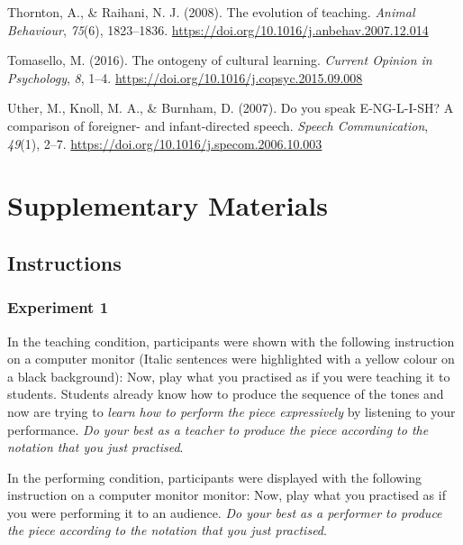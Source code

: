 \documentclass[
  english,
  man,floatsintext]{apa6}
\newlength{\cslhangindent}
\newenvironment{CSLReferences}[2] %
 {%
  \setlength{\parindent}{0pt}
  \ifodd #1 \everypar{\setlength{\hangindent}{\cslhangindent}}\ignorespaces\fi
  \ifnum #2 > 0
  \setlength{\parskip}{#2\baselineskip}
  \fi
 }%
 {}
\begin{document}
\begin{CSLReferences}{1}{0}
\leavevmode{}%
Thornton, A., \& Raihani, N. J. (2008). The evolution of teaching. \emph{Animal Behaviour}, \emph{75}(6), 1823--1836. \url{https://doi.org/10.1016/j.anbehav.2007.12.014}

\leavevmode{}%
Tomasello, M. (2016). The ontogeny of cultural learning. \emph{Current Opinion in Psychology}, \emph{8}, 1--4. \url{https://doi.org/10.1016/j.copsyc.2015.09.008}

\leavevmode{}%
Uther, M., Knoll, M. A., \& Burnham, D. (2007). Do you speak {E}-{NG}-{L}-{I}-{SH}? {A} comparison of foreigner- and infant-directed speech. \emph{Speech Communication}, \emph{49}(1), 2--7. \url{https://doi.org/10.1016/j.specom.2006.10.003}

\end{CSLReferences}

\endgroup

\clearpage

\hypertarget{supplementary}{%
\section{Supplementary Materials}\label{supplementary}}

\hypertarget{instructions}{%
\subsection{Instructions}\label{instructions}}

\hypertarget{experiment-1-1}{%
\subsubsection{Experiment 1}\label{experiment-1-1}}

In the teaching condition, participants were shown with the following instruction on a computer monitor (Italic sentences were highlighted with a yellow colour on a black background): Now, play what you practised as if you were teaching it to students. Students already know how to produce the sequence of the tones and now are trying to \emph{learn how to perform the piece expressively} by listening to your performance. \emph{Do your best as a teacher to produce the piece according to the notation that you just practised}.

In the performing condition, participants were displayed with the following instruction on a computer monitor monitor: Now, play what you practised as if you were performing it to an audience. \emph{Do your best as a performer to produce the piece according to the notation that you just practised}.
\end{document}
